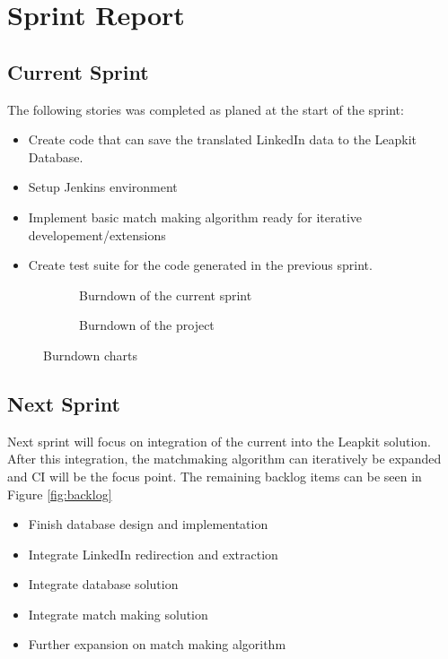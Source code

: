 \section{Sprint Report}

\subsection{Current Sprint}

The following stories was completed as planed at the start of the sprint:
\begin{itemize}
    \item Create code that can save the translated LinkedIn data to the Leapkit Database.
    \item Setup Jenkins environment
    \item Implement basic match making algorithm ready for iterative developement/extensions
    \item Create test suite for the code generated in the previous sprint.
\end{itemize}

\begin{figure}[!ht]
    \centering
    \begin{subfigure}[b]{0.5\textwidth}
        \scalebox{.6}{}
        \caption{Burndown of the current sprint}
        \label{fig:burndownSprint}
    \end{subfigure}%
    \begin{subfigure}[b]{0.5\textwidth}
        \scalebox{.7}{}
        \caption{Burndown of the project}
        \label{fig:burndownProject}
    \end{subfigure}
    \caption{Burndown charts}
\end{figure}

\subsection{Next Sprint}
Next sprint will focus on integration of the current into the Leapkit solution. After this integration, the matchmaking algorithm can iteratively be expanded and CI will be the focus point. The remaining backlog items can be seen in Figure \ref{fig:backlog}
\begin{itemize}
\item Finish database design and implementation
\item Integrate LinkedIn redirection and extraction
\item Integrate database solution
\item Integrate match making solution
\item Further expansion on match making algorithm
\end{itemize}

